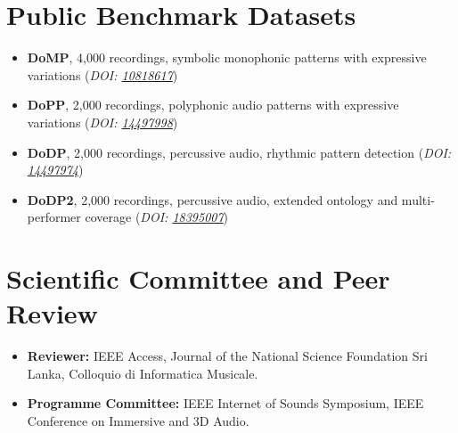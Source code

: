 \documentclass[11pt]{article}
\begin{document}
\section*{Public Benchmark Datasets \footnotesize {}}
\begin{itemize}[leftmargin=1.2em, itemsep=-0.25em]
    \item \textbf{DoMP}, 4,000 recordings, symbolic monophonic patterns with expressive variations (\textit{DOI: \href{https://doi.org/10.5281/zenodo.10818617}{\textit{10818617}}})
    \item \textbf{DoPP}, 2,000 recordings, polyphonic audio patterns with expressive variations (\textit{DOI: \href{https://doi.org/10.5281/zenodo.14497998}{\textit{14497998}}})
    \item \textbf{DoDP}, 2,000 recordings, percussive audio, rhythmic pattern detection (\textit{DOI: \href{https://doi.org/10.5281/zenodo.14497974}{\textit{14497974}}})
    \item \textbf{DoDP2}, 2,000 recordings, percussive audio, extended ontology and multi-performer coverage (\textit{DOI: \href{https://doi.org/10.5281/zenodo.18395007}{\textit{18395007}}})
\end{itemize}

\section*{Scientific Committee and Peer Review}
\begin{itemize}[leftmargin=1.2em, itemsep=-0.25em]
    \item \textbf{Reviewer:} IEEE Access, Journal of the National Science Foundation Sri Lanka, Colloquio di Informatica Musicale.
    \item \textbf{Programme Committee:} IEEE Internet of Sounds Symposium, IEEE Conference on Immersive and 3D Audio.
\end{itemize}
\end{document}
